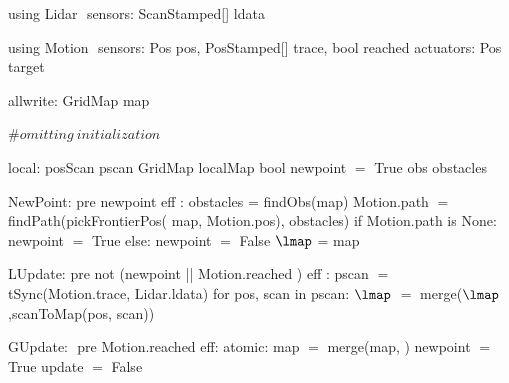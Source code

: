 using Lidar $\label{lidardef}$
    sensors:
       ScanStamped[] ldata

using Motion $\label{moddef}$
    sensors:
        Pos pos,
        PosStamped[] trace,
        bool reached
    actuators:
        Pos target

allwrite:$\label{awvar}$
    GridMap map

#$\mathit{omitting\ initialization}$

local:
   posScan pscan
   GridMap localMap
   bool newpoint $=$ True
   obs obstacles

NewPoint:$\label{newpt}$
  pre newpoint
  eff :
        obstacles = findObs(map)
        Motion.path $=$ findPath(pickFrontierPos(
                              map, Motion.pos), obstacles)
        if Motion.path is None:
           newpoint $=$ True
        else:
           newpoint $=$ False
        $\lmap $ = map

LUpdate:$\label{lup}$
   pre not (newpoint || Motion.reached )
   eff :
          pscan $=$ tSync(Motion.trace, Lidar.ldata)
         for pos, scan in pscan:
             $\lmap$ $=$ merge($\lmap$,scanToMap(pos, scan))

GUpdate: $\label{gup}$
  pre Motion.reached
  eff: atomic:
           map $=$ merge(map, \lmap)
        newpoint $=$ True
        update $=$ False